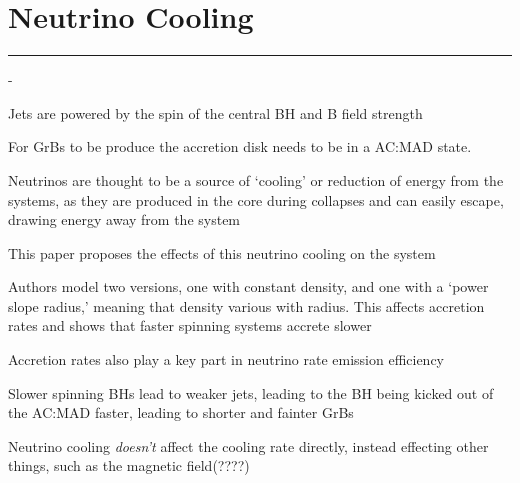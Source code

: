 \section{Neutrino Cooling}
\hrule
\vspace{.5cm}
\begin{list}{-}{}
\item Jets are powered by the spin of the central BH and B field strength
\item For GrBs to be produce the accretion disk needs to be in a \gls{AC:MAD} state. 
\item Neutrinos are thought to be a source of `cooling' or reduction of energy from the systems, as they are produced in the core during collapses and can easily escape, drawing energy away from the system
\item This paper proposes the effects of this neutrino cooling on the system
\item Authors model two versions, one with constant density, and one with a `power slope radius,' meaning that density various with radius. This affects accretion rates and shows that faster spinning systems accrete slower
\item Accretion rates also play a key part in neutrino rate emission efficiency
\item Slower spinning BHs lead to weaker jets, leading to the BH being kicked out of the \gls{AC:MAD} faster, leading to shorter and fainter GrBs
\item Neutrino cooling \textit{doesn't} affect the cooling rate directly, instead effecting other things, such as the magnetic field(????) 
\end{list}